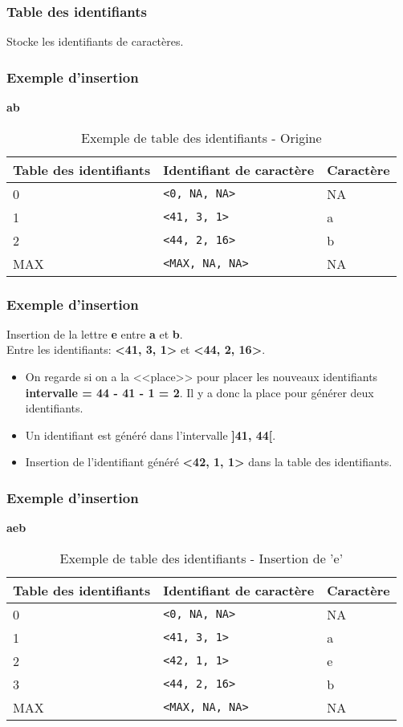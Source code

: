   \begin{frame}  
  \frametitle{Table des identifiants}
  	Stocke les identifiants de	caractères.
  \end{frame}


\begin{frame}  
  \frametitle{Exemple d'insertion}
  	\begin{center}
		\textbf{ab}
	\end{center}
  	\begin{table}
			\center
			\begin{tabular}{|l|l|l|}			
			\hline
				Table des identifiants & Identifiant de caractère & Caractère\\
			\hline
				0 & \verb+<0, NA, NA>+ & NA\\
				1 & \verb+<41, 3, 1>+ & a\\
				2 & \verb+<44, 2, 16>+ & b\\
				MAX & \verb+<MAX, NA, NA>+ & NA\\
			\hline
			\end{tabular}
			\caption{Exemple de table des identifiants - Origine}
		\end{table}
	\end{frame}
	
\begin{frame}  
  \frametitle{Exemple d'insertion}
  	Insertion de la lettre \textbf{e} entre \textbf{a} et \textbf{b}.\\
  	Entre les identifiants:
  	\textbf{<41, 3, 1>} et \textbf{<44, 2, 16>}.
  	\begin{itemize}
		\item On regarde si on a la <<place>> pour placer les nouveaux
			identifiants\\ \textbf{intervalle = 44 - 41 - 1 = 2}. 
			Il y a donc la place pour générer deux identifiants.
		\item Un identifiant est généré dans l'intervalle \textbf{]41, 44[}.
		\item Insertion de l'identifiant généré \textbf{<42, 1, 1>} dans la table des identifiants.
	\end{itemize}
\end{frame}

\begin{frame}	
	\frametitle{Exemple d'insertion}
  	\begin{center}
		\textbf{aeb}
	\end{center}
  	\begin{table}
			\center
			\begin{tabular}{|l|l|l|}			
			\hline
				Table des identifiants & Identifiant de caractère & Caractère\\
			\hline
				0 & \verb+<0, NA, NA>+ & NA\\
				1 & \verb+<41, 3, 1>+ & a\\
				2 & \verb+<42, 1, 1>+ & e\\
				3 & \verb+<44, 2, 16>+ & b\\
				MAX & \verb+<MAX, NA, NA>+ & NA\\
			\hline
			\end{tabular}
			\caption{Exemple de table des identifiants - Insertion de 'e'}
		\end{table}
	\end{frame}